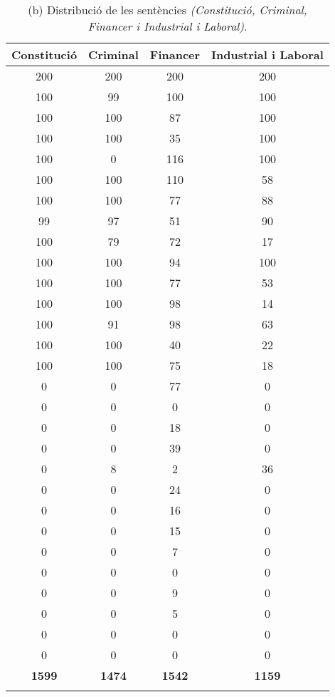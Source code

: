 \begin{table}[H]
    \centering
    \begin{tabular}{cccc}
        \Xhline{2\arrayrulewidth}
        \textbf{Constitució} &
        \textbf{Criminal} &
        \textbf{Financer} &
        \textbf{Industrial i Laboral} \\
        \hline
        200 & 200 & 200 & 200 \\
        100 & 99 & 100 & 100 \\
        100 & 100 & 87 & 100 \\
        100 & 100 & 35 & 100 \\
        100 & 0 & 116 & 100 \\
        100 & 100 & 110 & 58 \\
        100 & 100 & 77 & 88 \\
        99 & 97 & 51 & 90 \\
        100 & 79 & 72 & 17 \\
        100 & 100 & 94 & 100 \\
        100 & 100 & 77 & 53 \\
        100 & 100 & 98 & 14 \\
        100 & 91 & 98 & 63 \\
        100 & 100 & 40 & 22 \\
        100 & 100 & 75 & 18 \\
        0 & 0 & 77 & 0 \\
        0 & 0 & 0 & 0 \\
        0 & 0 & 18 & 0 \\
        0 & 0 & 39 & 0 \\
        0 & 8 & 2 & 36 \\
        0 & 0 & 24 & 0 \\
        0 & 0 & 16 & 0 \\
        0 & 0 & 15 & 0 \\
        0 & 0 & 7 & 0 \\
        0 & 0 & 0 & 0 \\
        0 & 0 & 9 & 0 \\
        0 & 0 & 5 & 0 \\
        0 & 0 & 0 & 0 \\
        0 & 0 & 0 & 0 \\
        \hline
        \textbf{1599} & \textbf{1474} & \textbf{1542} & \textbf{1159} \\
        \Xhline{2\arrayrulewidth}
    \end{tabular}
    \captionsetup{font=small}
    \caption*{(b) Distribució de les sentències \textit{(Constitució, Criminal, Financer i Industrial i Laboral)}.}
\end{table}

